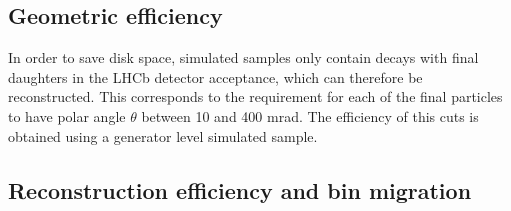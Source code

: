 


\subsection{Geometric efficiency}


In order to save disk space, simulated samples only contain decays with final daughters
in the LHCb detector acceptance, which can therefore be reconstructed. 
This corresponds to the requirement for each of the final particles
to have polar angle $\theta$ between 10 and 400 mrad. The efficiency of this
cuts is obtained using a generator level simulated sample.

\subsection{Reconstruction efficiency and bin migration}
\label{sec:reco_binmig}

